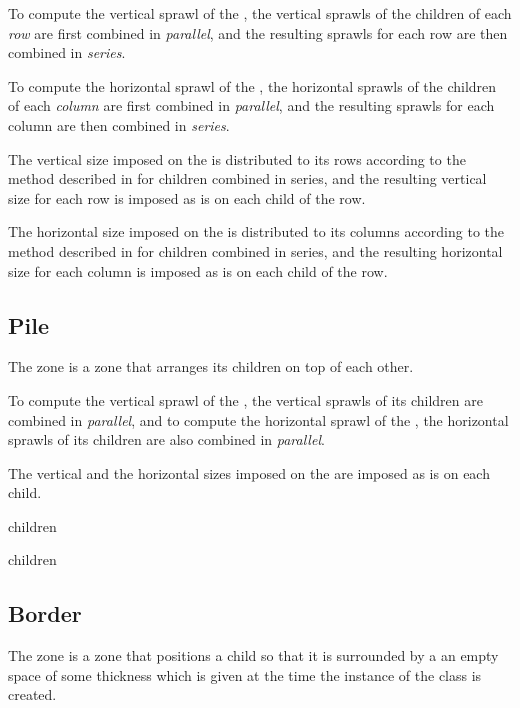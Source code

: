 To compute the vertical sprawl of the , the vertical
sprawls of the children of each \emph{row} are first combined in
\emph{parallel}, and the resulting sprawls for each row are then
combined in \emph{series}.  

To compute the horizontal sprawl of the , the horizontal
sprawls of the children of each \emph{column} are first combined in
\emph{parallel}, and the resulting sprawls for each column are then
combined in \emph{series}.

The vertical size imposed on the  is distributed to its
rows according to the method described in
 for children combined in
series, and the resulting vertical size for each row is imposed as is
on each child of the row.

The horizontal size imposed on the  is distributed to its
columns according to the method described in
 for children combined in
series, and the resulting horizontal size for each column is imposed
as is on each child of the row.

\subsection{Pile}
\label{sec-zones-layout-pile}

The  zone is a zone that arranges its children on top of
each other.

To compute the vertical sprawl of the , the vertical
sprawls of its children are combined in \emph{parallel}, and to
compute the horizontal sprawl of the , the horizontal
sprawls of its children are also combined in \emph{parallel}. 


The vertical and the horizontal sizes imposed on the 
are imposed as is on each child.


 {children}

 {\rest children}

\subsection{Border}
\label{sec-zones-layout-border}

The  zone is a zone that positions a child so that it is
surrounded by a an empty space of some thickness which is given at the
time the instance of the  class is created.

